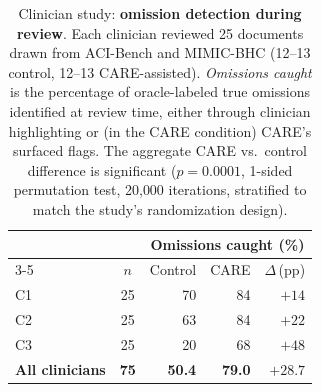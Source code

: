 \begin{table}[h!]
\centering
\small
\caption{Clinician study: \textbf{omission detection during review}. Each clinician reviewed 25 documents drawn from ACI-Bench and MIMIC-BHC (12--13 control, 12--13 \textsc{CARE}-assisted). \emph{Omissions caught} is the percentage of oracle-labeled true omissions identified at review time, either through clinician highlighting or (in the \textsc{CARE} condition) \textsc{CARE}'s surfaced flags. The aggregate \textsc{CARE} vs.\ control difference is significant ($p = 0.0001$, 1-sided permutation test, 20{,}000 iterations, stratified to match the study's randomization design).}
\label{tab:clinician-study}
\begin{tabular}{l c rr r}
\toprule
 & & \multicolumn{3}{c}{Omissions caught (\%)} \\
\cmidrule(lr){3-5}
 & $n$ & Control & \textsc{CARE} & $\Delta$\,(pp) \\
\midrule
C1 & 25 & 70 & 84 & $+14$ \\
C2 & 25 & 63 & 84 & $+22$ \\
C3 & 25 & 20 & 68 & $+48$ \\
\midrule
\textbf{All clinicians} & \textbf{75} & \textbf{50.4} & \textbf{79.0} & $\mathbf{+28.7}$ \\
\bottomrule
\end{tabular}
\end{table}